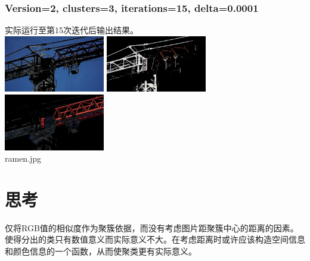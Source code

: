 \documentclass{article}
\begin{document}
\subsubsection{Version=2, clusters=3, iterations=15, delta=0.0001}
实际运行至第15次迭代后输出结果。\\
\includegraphics[width=0.33\textwidth]{src/v2_i15d1e-4section1.png}
\includegraphics[width=0.33\textwidth]{src/v2_i15d1e-4section2.png}
\includegraphics[width=0.33\textwidth]{src/v2_i15d1e-4section3.png}\\
ramen.jpg\\

\section{思考}
仅将RGB值的相似度作为聚簇依据，而没有考虑图片距聚簇中心的距离的因素。使得分出的类只有数值意义而实际意义不大。在考虑距离时或许应该构造空间信息和颜色信息的一个函数，从而使聚类更有实际意义。
\end{document}
